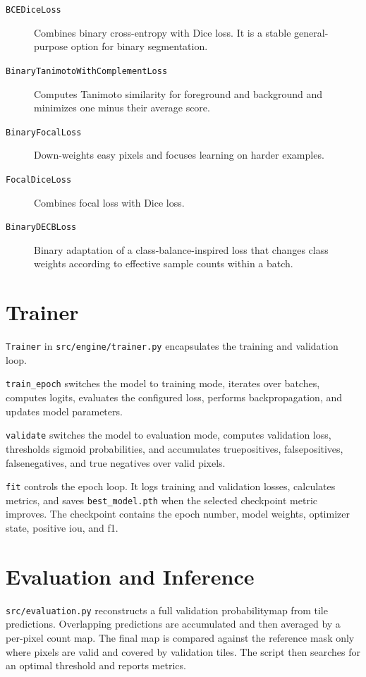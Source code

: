 \begin{sloppypar}
\begin{description}
    \item[\texttt{BCEDiceLoss}] Combines binary cross-entropy with Dice loss. It is a stable general-purpose option for binary segmentation.
    \item[\texttt{BinaryTanimotoWithComplementLoss}] Computes Tanimoto similarity for foreground and background and minimizes one minus their average score.
    \item[\texttt{BinaryFocalLoss}] Down-weights easy pixels and focuses learning on harder examples.
    \item[\texttt{FocalDiceLoss}] Combines focal loss with Dice loss.
    \item[\texttt{BinaryDECBLoss}] Binary adaptation of a class-balance-inspired loss that changes class weights according to effective sample counts within a batch.
\end{description}

\section{Trainer}

\texttt{Trainer} in \texttt{src/engine/trainer.py} encapsulates the training and validation loop.

\texttt{train\_epoch} switches the model to training mode, iterates over batches, computes logits, evaluates the configured loss, performs backpropagation, and updates model parameters.

\texttt{validate} switches the model to evaluation mode, computes validation loss, thresholds sigmoid probabilities, and accumulates \glspl{truepositive}, \glspl{falsepositive}, \glspl{falsenegative}, and true negatives over valid pixels.

\texttt{fit} controls the epoch loop. It logs training and validation losses, calculates metrics, and saves \texttt{best\_model.pth} when the selected checkpoint metric improves. The checkpoint contains the epoch number, model weights, optimizer state, positive \gls{iou}, and \gls{f1}.

\section{Evaluation and Inference}

\texttt{src/evaluation.py} reconstructs a full validation \gls{probabilitymap} from tile predictions. Overlapping predictions are accumulated and then averaged by a per-pixel count map. The final map is compared against the reference mask only where pixels are valid and covered by validation tiles. The script then searches for an optimal threshold and reports metrics.


\end{sloppypar}

